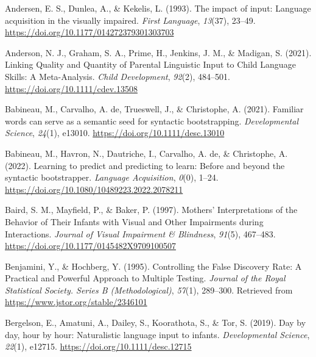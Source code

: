\documentclass[
  man]{apa6}
\newlength{\cslhangindent}
\newlength{\cslentryspacingunit} %
\newenvironment{CSLReferences}[2] %
 {%
  \setlength{\parindent}{0pt}
  \ifodd #1
  \let\oldpar\par
  \def\par{\hangindent=\cslhangindent\oldpar}
  \fi
  \setlength{\parskip}{#2\cslentryspacingunit}
 }%
 {}
\begin{document}
\hypertarget{refs}{}
\begin{CSLReferences}{1}{0}
\leavevmode{}%
Andersen, E. S., Dunlea, A., \& Kekelis, L. (1993). The impact of input: Language acquisition in the visually impaired. \emph{First Language}, \emph{13}(37), 23--49. \url{https://doi.org/10.1177/014272379301303703}

\leavevmode{}%
Anderson, N. J., Graham, S. A., Prime, H., Jenkins, J. M., \& Madigan, S. (2021). Linking {Quality} and {Quantity} of {Parental} {Linguistic} {Input} to {Child} {Language} {Skills}: {A} {Meta}-{Analysis}. \emph{Child Development}, \emph{92}(2), 484--501. \url{https://doi.org/10.1111/cdev.13508}

\leavevmode{}%
Babineau, M., Carvalho, A. de, Trueswell, J., \& Christophe, A. (2021). Familiar words can serve as a semantic seed for syntactic bootstrapping. \emph{Developmental Science}, \emph{24}(1), e13010. \url{https://doi.org/10.1111/desc.13010}

\leavevmode{}%
Babineau, M., Havron, N., Dautriche, I., Carvalho, A. de, \& Christophe, A. (2022). Learning to predict and predicting to learn: {Before} and beyond the syntactic bootstrapper. \emph{Language Acquisition}, \emph{0}(0), 1--24. \url{https://doi.org/10.1080/10489223.2022.2078211}

\leavevmode{}%
Baird, S. M., Mayfield, P., \& Baker, P. (1997). Mothers' {Interpretations} of the {Behavior} of {Their} {Infants} with {Visual} and {Other} {Impairments} during {Interactions}. \emph{Journal of Visual Impairment \& Blindness}, \emph{91}(5), 467--483. \url{https://doi.org/10.1177/0145482X9709100507}

\leavevmode{}%
Benjamini, Y., \& Hochberg, Y. (1995). Controlling the {False} {Discovery} {Rate}: {A} {Practical} and {Powerful} {Approach} to {Multiple} {Testing}. \emph{Journal of the Royal Statistical Society. Series B (Methodological)}, \emph{57}(1), 289--300. Retrieved from \url{https://www.jstor.org/stable/2346101}

\leavevmode{}%
Bergelson, E., Amatuni, A., Dailey, S., Koorathota, S., \& Tor, S. (2019). Day by day, hour by hour: {Naturalistic} language input to infants. \emph{Developmental Science}, \emph{22}(1), e12715. \url{https://doi.org/10.1111/desc.12715}


\end{CSLReferences}
\end{document}
